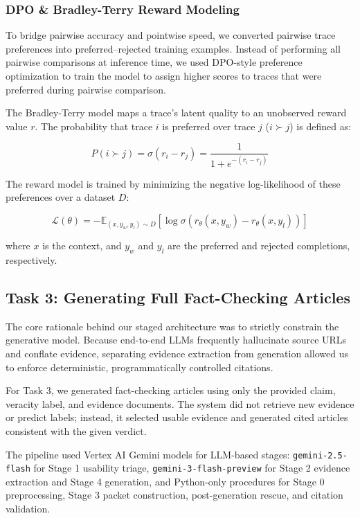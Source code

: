 \documentclass[
]{ceurart}
\begin{document}
\subsubsection{DPO \& Bradley-Terry Reward Modeling}

To bridge pairwise accuracy and pointwise speed, we converted pairwise trace preferences into
preferred--rejected training examples. Instead of performing all pairwise comparisons at inference
time, we used DPO-style preference optimization to train the model to assign higher scores to traces
that were preferred during pairwise comparison.

The Bradley-Terry model maps a trace's latent quality to an unobserved reward value $r$. The probability that trace $i$ is preferred over trace $j$ ($i \succ j$) is defined as:

\begin{equation}
P(i \succ j) = \sigma(r_i - r_j) = \frac{1}{1 + e^{-(r_i - r_j)}}
\end{equation}

The reward model is trained by minimizing the negative log-likelihood of these preferences over a dataset $D$:

\begin{equation}
\mathcal{L}(\theta) = -\mathbb{E}_{(x, y_w, y_l) \sim D} \left[ \log \sigma \left( r_\theta(x, y_w) - r_\theta(x, y_l) \right) \right]
\end{equation}

where $x$ is the context, and $y_w$ and $y_l$ are the preferred and rejected completions, respectively.

\subsection{Task 3: Generating Full Fact-Checking Articles}

The core rationale behind our staged architecture was to strictly constrain the generative model. Because end-to-end LLMs frequently hallucinate source URLs and conflate evidence, separating evidence extraction from generation allowed us to enforce deterministic, programmatically controlled citations.

For Task 3, we generated fact-checking articles using only the provided claim, veracity label, and evidence documents. The system did not retrieve new evidence or predict labels; instead, it selected usable evidence and generated cited articles consistent with the given verdict.

The pipeline used Vertex AI Gemini models for LLM-based stages: \texttt{gemini-2.5-flash} for Stage 1 usability triage, \texttt{gemini-3-flash-preview} for Stage 2 evidence extraction and Stage 4 generation, and Python-only procedures for Stage 0 preprocessing, Stage 3 packet construction, post-generation rescue, and citation validation.
\end{document}
